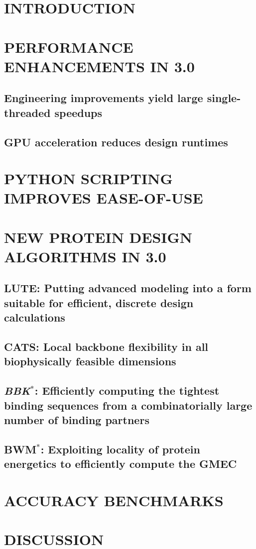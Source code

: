 \documentclass[12pt]{article}
\def\osprey{{\sc{osprey}}\xspace}
\def\bwmstar{BWM$^*$}
\def\bbks{\textit{BBK$^*$}\xspace}
\newcommand{\jccsubsection}[1]{\subsection*{\sffamily \large #1}}
\begin{document}
  \makeatletter
  \renewcommand\@biblabel[1]{#1.}
  \makeatother



\renewcommand{\baselinestretch}{1.5}
\normalsize


\clearpage


\section*{\sffamily \Large INTRODUCTION} 


\section*{\sffamily \Large PERFORMANCE ENHANCEMENTS IN \osprey 3.0}
\jccsubsection{Engineering improvements yield large single-threaded speedups}

\jccsubsection{GPU acceleration reduces design runtimes}


\section*{\sffamily \Large PYTHON SCRIPTING IMPROVES EASE-OF-USE}



\section*{\sffamily \Large NEW PROTEIN DESIGN ALGORITHMS IN \osprey 3.0}
\jccsubsection{LUTE: Putting advanced modeling into a form suitable for efficient, discrete design calculations}

\jccsubsection{CATS: Local backbone flexibility in all biophysically feasible dimensions}

\jccsubsection{\bbks: Efficiently computing the tightest binding sequences from a combinatorially large number of binding partners}

\jccsubsection{\bwmstar: Exploiting locality of protein energetics to efficiently compute the GMEC}


\section*{\sffamily \Large ACCURACY BENCHMARKS}


\section*{\sffamily \Large DISCUSSION}

\end{document}

